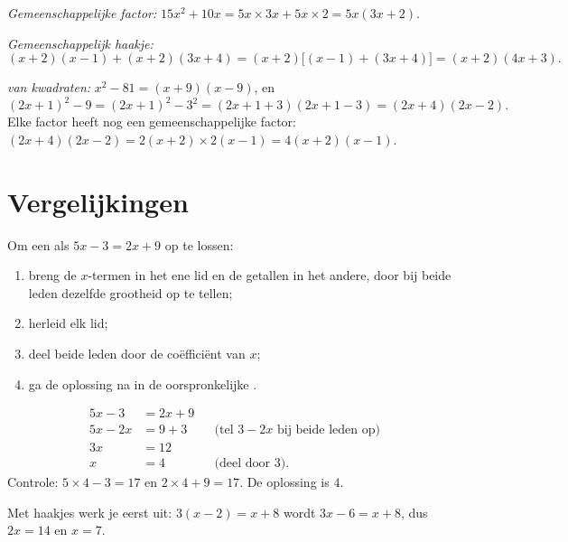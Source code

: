 \begin{example}\label{ex:g9:algebra:factor}
\emph{Gemeenschappelijke factor:}
$15x^2 + 10x = 5x \times 3x + 5x \times 2 = 5x(3x + 2)$.

\emph{Gemeenschappelijk haakje:}
\[
(x+2)(x-1) + (x+2)(3x+4) = (x+2)\bigl[(x-1) + (3x+4)\bigr]
= (x+2)(4x+3).
\]

\emph{ van kwadraten:} $x^2 - 81 = (x+9)(x-9)$, en
\[
(2x+1)^2 - 9 = (2x+1)^2 - 3^2 = (2x+1+3)(2x+1-3) = (2x+4)(2x-2).
\]
Elke factor heeft nog een gemeenschappelijke factor:
$(2x+4)(2x-2) = 2(x+2) \times 2(x-1) = 4(x+2)(x-1)$.
\end{example}

\section{Vergelijkingen}

\begin{method}\label{met:g9:algebra:firstdegree}
Om een  als $5x - 3 = 2x + 9$ op te lossen:
\begin{enumerate}
  \item breng de $x$-termen in het ene lid en de getallen in het andere, door bij
        beide leden dezelfde grootheid op te tellen;
  \item herleid elk lid;
  \item deel beide leden door de coëfficiënt van $x$;
  \item ga de oplossing na in de oorspronkelijke .
\end{enumerate}
\end{method}

\begin{example}\label{ex:g9:algebra:firstdegree}
\begin{align*}
5x - 3 &= 2x + 9 \\
5x - 2x &= 9 + 3 && \text{(tel $3 - 2x$ bij beide leden op)}\\
3x &= 12 \\
x &= 4 && \text{(deel door 3).}
\end{align*}
Controle: $5 \times 4 - 3 = 17$ en $2 \times 4 + 9 = 17$. De oplossing is $4$.

Met haakjes werk je eerst uit: $3(x - 2) = x + 8$ wordt $3x - 6 = x + 8$, dus
$2x = 14$ en $x = 7$.
\end{example}

